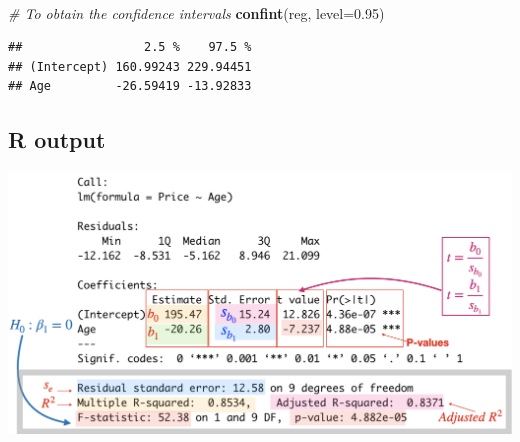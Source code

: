 \documentclass[
]{article}
\newenvironment{Shaded}{\begin{snugshade}}{\end{snugshade}}
\newcommand{\AttributeTok}[1]{\textcolor[rgb]{0.13,0.29,0.53}{#1}}
\newcommand{\CommentTok}[1]{\textcolor[rgb]{0.56,0.35,0.01}{\textit{#1}}}
\newcommand{\FloatTok}[1]{\textcolor[rgb]{0.00,0.00,0.81}{#1}}
\newcommand{\FunctionTok}[1]{\textcolor[rgb]{0.13,0.29,0.53}{\textbf{#1}}}
\newcommand{\NormalTok}[1]{#1}
\begin{document}
\(~\)

\begin{Shaded}
\begin{Highlighting}[]
\CommentTok{\# To obtain the confidence intervals }
\FunctionTok{confint}\NormalTok{(reg, }\AttributeTok{level=}\FloatTok{0.95}\NormalTok{)}
\end{Highlighting}
\end{Shaded}

\begin{verbatim}
##                 2.5 %    97.5 %
## (Intercept) 160.99243 229.94451
## Age         -26.59419 -13.92833
\end{verbatim}

\hypertarget{r-output}{%
\subsection{R output}\label{r-output}}

\begin{center}\includegraphics[width=0.8\linewidth,height=0.8\textheight]{figures/regRoutput} \end{center}
\end{document}
